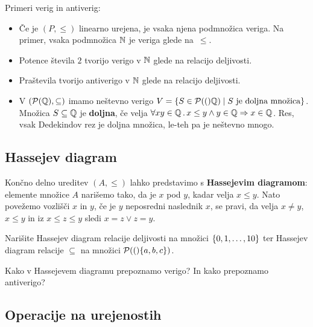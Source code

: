 \begin{zgled}
\end{zgled}

\begin{zgled}
  Primeri verig in antiverig:
  \begin{itemize}
  \item Če je $(P, {\leq})$ linearno urejena, je vsaka njena podmnožica veriga. Na primer, vsaka podmnožica $\mathbb{N}$ je veriga glede na~$\leq$.
  \item Potence števila $2$ tvorijo verigo v $\mathbb{N}$ glede na relacijo deljivosti.
  \item Praštevila tvorijo antiverigo v $\mathbb{N}$ glede na relacijo deljivosti.
  \item V $(\mathcal{P}(\mathbb{Q}), {\subseteq})$ imamo neštevno verigo
    $V = \left\{S \in \mathcal{P}(()\mathbb{Q}) \mid \text{$S$ je doljna množica}\right\}$.
    Množica $S \subseteq \mathbb{Q}$ je \textbf{doljna}, če velja
    $\forall x y \in \mathbb{Q} \,.\, x \leq y \land y \in \mathbb{Q} \Rightarrow x \in \mathbb{Q}$.
    Res, vsak Dedekindov rez je doljna množica, le-teh pa je neštevno mnogo.
  \end{itemize}
\end{zgled}



\subsection{Hassejev diagram}

Končno delno ureditev $(A, \leq)$ lahko predstavimo s \textbf{Hassejevim diagramom}: elemente
množice $A$ narišemo tako, da je $x$ pod $y$, kadar velja $x \leq y$. Nato povežemo vozlišči $x$ in $y$, če je $y$ neposredni naslednik $x$, se pravi, da velja $x \neq y$, $x \leq y$ in iz $x \leq z \leq y$ sledi $x = z \lor z = y$.

\begin{vaja}
  Narišite Hassejev diagram relacije deljivosti na množici $\left\{0, 1, \dots, 10\right\}$ ter
  Hassejev diagram relacije $\subseteq$ na množici $\mathcal{P}(()\{a,b,c\})$.
\end{vaja}

\begin{vaja}
  Kako v Hassejevem diagramu prepoznamo verigo? In kako prepoznamo antiverigo?
\end{vaja}


\subsection{Operacije na urejenostih}

